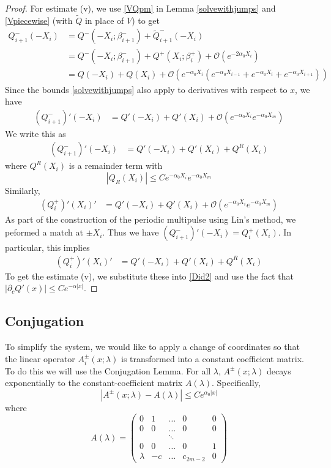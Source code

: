 \documentclass[thesis.tex]{subfiles}
\begin{document}
\begin{lemma}
\begin{proof}
For estimate (v), we use \eqref{VQpm} in Lemma \ref{solvewithjumps} and \eqref{Vpiecewise} (with $\tilde{Q}$ in place of $V$) to get
\begin{align*}
Q_{i+1}^-(-X_i) &= Q^-(-X_i; \beta_{i+1}^-) + \tilde{Q}_{i+1}^-(-X_i) \\
&= Q^-(-X_i; \beta_{i+1} ^-) + Q^+(X_i; \beta_i^+) + \mathcal{O}(e^{-2 \alpha_0 X_i}) \\
&= Q(-X_i) + Q(X_i) 
+ \mathcal{O}(e^{-\alpha_0 X_i}(e^{-\alpha_0 X_{i-1}}+e^{-\alpha_0 X_i}+e^{-\alpha_0 X_{i+1}}))
\end{align*}
Since the bounds \ref{solvewithjumps} also apply to derivatives with respect to $x$, we have
\begin{align*}
(Q_{i+1}^-)'(-X_i) &= Q'(-X_i) + Q'(X_i) + \mathcal{O}(e^{-\alpha_0 X_i}e^{-\alpha_0 X_m})
\end{align*}
We write this as 
\begin{align*}
(Q_{i+1}^-)'(-X_i) &= Q'(-X_i) + Q'(X_i) + Q^R(X_i)
\end{align*}
where $Q^R(X_i)$ is a remainder term with
\[
|Q_R(X_i)| \leq C e^{-\alpha_0 X_i} e^{-\alpha_0 X_m}
\]
Similarly,
\begin{align*}
(Q_i^+)'(X_i)' &= Q'(-X_i) + Q'(X_i) + \mathcal{O}(e^{-\alpha_0 X_i}e^{-\alpha_0 X_m})
\end{align*}
As part of the construction of the periodic multipulse using Lin's method, we peformed a match at $\pm X_i$. Thus we have
$(Q_{i+1}^-)'(-X_i) = Q_i^+(X_i)$. In particular, this implies \begin{align*}
(Q_i^+)'(X_i)' &= Q'(-X_i) + Q'(X_i) + Q^R(X_i)
\end{align*}
To get the estimate (v), we substitute these into \eqref{Did2} and use the fact that $|\partial_c Q'(x)| \leq C e^{-\alpha |x|}$.
\end{proof}
\end{lemma}

\subsection{Conjugation}

To simplify the system, we would like to apply a change of coordinates so that the linear operator $A_i^\pm(x; \lambda)$ is transformed into a constant coefficient matrix. To do this we will use the Conjugation Lemma. For all $\lambda$, $A^\pm(x; \lambda)$ decays exponentially to the constant-coefficient matrix $A(\lambda)$. Specifically, 
\[
|A^\pm(x; \lambda) - A(\lambda)| \leq C e^{\alpha_0 |x|}
\]
where
\begin{equation}\label{Alambda}
A(\lambda) = \begin{pmatrix}
0 & 1 & \dots & 0 & 0 \\
0 & 0 & \dots & 0 & 0 \\
& & \ddots  \\
0 & 0 & \dots & 0 & 1 \\
\lambda & -c & \dots & c_{2m-2} & 0
\end{pmatrix}
\end{equation}
\end{document}
